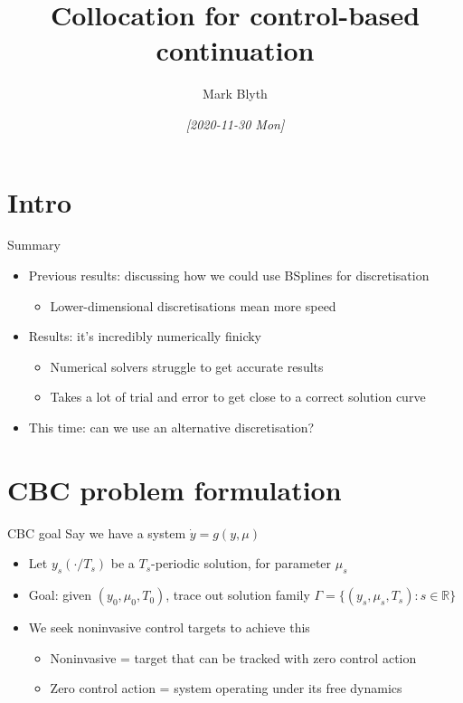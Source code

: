 \documentclass[presentation]{beamer}
\author{Mark Blyth}
\date{\textit{[2020-11-30 Mon]}}
\title{Collocation for control-based continuation}
\begin{document}
\maketitle

\section{Intro}
\label{sec:org96b2791}
\begin{frame}[label={sec:orgf6fc485}]{Summary}
\begin{itemize}
\item Previous results: discussing how we could use BSplines for discretisation
\begin{itemize}
\item Lower-dimensional discretisations mean more speed
\end{itemize}
\end{itemize}
\vfill
\begin{itemize}
\item Results: it's incredibly numerically finicky
\begin{itemize}
\item Numerical solvers struggle to get accurate results
\item Takes a lot of trial and error to get close to a correct solution curve
\end{itemize}
\end{itemize}
\vfill
\begin{itemize}
\item This time: can we use an alternative discretisation?
\end{itemize}
\end{frame}

\section{CBC problem formulation}
\label{sec:orgd4e067e}
\begin{frame}[label={sec:org33993e1}]{CBC goal}
Say we have a system \(\dot{y} = g(y,\mu)\)
\vfill
\begin{itemize}
\item Let \(y_s(\cdot/T_s)\) be a \(T_s\)-periodic solution, for parameter \(\mu_s\)
\end{itemize}
\vfill
\begin{itemize}
\item Goal: given \((y_0, \mu_0, T_0)\), trace out solution family \(\Gamma = \{(y_s, \mu_s, T_s):s\in\mathbb{R}\}\)
\end{itemize}
\vfill
\begin{itemize}
\item We seek noninvasive control targets to achieve this
\begin{itemize}
\item Noninvasive = target that can be tracked with zero control action
\item Zero control action = system operating under its free dynamics
\end{itemize}
\end{itemize}
\end{frame}
\end{document}
